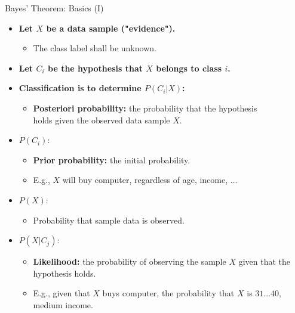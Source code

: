\begin{frame}{Bayes' Theorem: Basics (I)}
	\begin{itemize}
		\item \textbf{Let $X$ be a data sample ("evidence").}
		      \begin{itemize}
			      \item The class label shall be unknown.
		      \end{itemize}
		\item \textbf{Let $C_i$ be the hypothesis that $X$ belongs to class $i$.}
		\item \textbf{Classification is to determine $P(C_i|X)$:}
		      \begin{itemize}
			      \item \textbf{\color{airforceblue}Posteriori probability:} the probability that the hypothesis \\ holds given the observed data sample $X$.
		      \end{itemize}
		\item $P(C_i)$:
		      \begin{itemize}
			      \item \textbf{\color{airforceblue}Prior probability:} the initial probability.
			      \item E.g., $X$ will buy computer, regardless of age, income, $\ldots$
		      \end{itemize}
		\item $P(X)$:
		      \begin{itemize}
			      \item Probability that sample data is observed.
		      \end{itemize}
		\item $P(X|C_j)$:
		      \begin{itemize}
			      \item \textbf{\color{airforceblue}Likelihood:} the probability of observing the sample $X$ given that the hypothesis holds.
			      \item E.g., given that $X$ buys computer, the probability that $X$ is $31\ldots40$, medium income.
		      \end{itemize}
	\end{itemize}
\end{frame}

